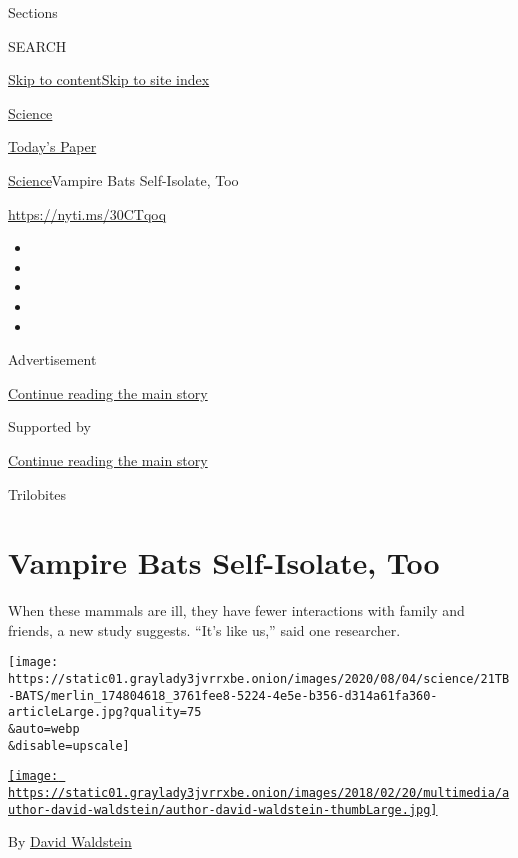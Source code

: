 Sections

SEARCH

\protect\hyperlink{site-content}{Skip to
content}\protect\hyperlink{site-index}{Skip to site index}

\href{https://www.nytimes3xbfgragh.onion/section/science}{Science}

\href{https://myaccount.nytimes3xbfgragh.onion/auth/login?response_type=cookie\&client_id=vi}{}

\href{https://www.nytimes3xbfgragh.onion/section/todayspaper}{Today's
Paper}

\href{/section/science}{Science}\textbar{}Vampire Bats Self-Isolate, Too

\url{https://nyti.ms/30CTqoq}

\begin{itemize}
\item
\item
\item
\item
\item
\end{itemize}

Advertisement

\protect\hyperlink{after-top}{Continue reading the main story}

Supported by

\protect\hyperlink{after-sponsor}{Continue reading the main story}

Trilobites

\hypertarget{vampire-bats-self-isolate-too}{%
\section{Vampire Bats Self-Isolate,
Too}\label{vampire-bats-self-isolate-too}}

When these mammals are ill, they have fewer interactions with family and
friends, a new study suggests. ``It's like us,'' said one researcher.

\texttt{[image: https://static01.graylady3jvrrxbe.onion/images/2020/08/04/science/21TB-BATS/merlin\_174804618\_3761fee8-5224-4e5e-b356-d314a61fa360-articleLarge.jpg?quality=75\\\&auto=webp\\\&disable=upscale]}

\href{https://www.nytimes3xbfgragh.onion/by/david-waldstein}{\texttt{[image: https://static01.graylady3jvrrxbe.onion/images/2018/02/20/multimedia/author-david-waldstein/author-david-waldstein-thumbLarge.jpg]}}

By \href{https://www.nytimes3xbfgragh.onion/by/david-waldstein}{David
Waldstein}

